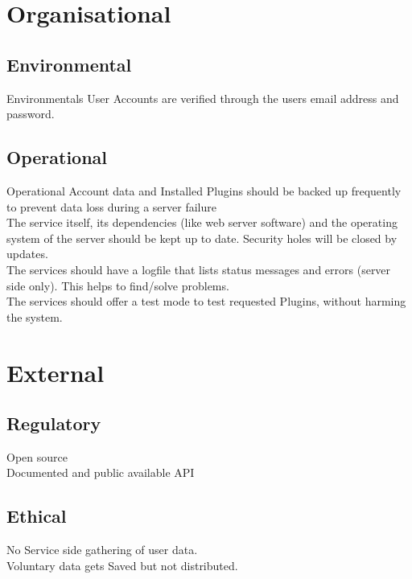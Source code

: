 \documentclass[8pt]{beamer}
\begin{document}
\section{Organisational}
\subsection{Environmental}
\begin{frame}{Environmentals}
User Accounts are verified through the users email address and
password.
\end{frame}

\subsection{Operational}

\begin{frame}{Operational}
Account data and Installed Plugins should be backed up frequently
to prevent data loss during a server failure
\\\pause The service itself, its dependencies (like web server software) and
the operating system of the server should be kept up to date. Security holes
will be closed by updates.
\\\pause The services should have a logfile that lists status messages and
errors (server side only). This helps to find/solve problems.
\\\pause  The services should offer a test mode to test requested Plugins,
without harming the system.
\end{frame}

\section{External}

\subsection{Regulatory}

\begin{frame}
Open source\\\pause
Documented and public available API
\end{frame}

\subsection{Ethical}

\begin{frame}
No Service side gathering of user data.\\\pause
Voluntary data gets Saved but not distributed.
\end{frame}
\end{document}
